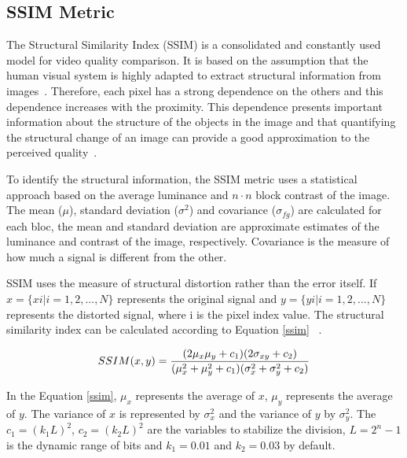 \documentclass[journal]{IEEEtran}
\begin{document}
\subsection{SSIM Metric}


The Structural Similarity Index (SSIM) is a consolidated and constantly used model for video quality comparison. It is based on the assumption that the human visual system is highly adapted to extract structural information from images~\cite{danilo:12}. Therefore, each pixel has a strong dependence on the others and this dependence increases with the proximity. This dependence presents important information about the structure of the objects in the image and that quantifying the structural change of an image can provide a good approximation to the perceived quality~\cite{Wang:02}.

To identify the structural information, the SSIM metric uses a statistical approach based on the average luminance and $n \cdot n$ block contrast of the image. The mean ($\mu$), standard deviation ($\sigma^{2}$) and covariance ($\sigma_{fg}$) are calculated for each bloc, the mean and standard deviation are approximate estimates of the luminance and contrast of the image, respectively. Covariance is the measure of how much a signal is different from the other.

SSIM uses the measure of structural distortion rather than the error itself. If $x = \{x i | i = 1, 2,. . . , N\}$ represents the original signal and $y = \{y i | i = 1, 2,. . . , N\}$ represents the distorted signal, where i is the pixel index value. The structural similarity index can be calculated according to Equation \ref{ssim} ~\cite{oliveira:16}\cite{Wang:02}.

\begin{equation}
\label{ssim}
\centering
SSIM(x, y) = \frac{(2\mu _{x}\mu _{y} + c _{1})(2\sigma _{xy}+c _{2})}{(\mu_{x}^{2}+\mu_{y}^{2}+ c_{1})(\sigma _{x}^{2}+\sigma _{y}^{2}+c _{2})}
\end{equation}



In the Equation \ref{ssim},  $\mu_{x}$ represents the average of $x$,  $\mu_{y}$ represents the average of $y$. The variance of $x$ is represented by $\sigma _{x}^{2}$ and the variance of $y$ by $\sigma _{y}^{2}$. The $c_{1}=(k_{1}L)^{2}$, $c_{2}=(k_{2}L)^{2}$ are the variables to stabilize the division, $L = 2^{n} - 1$ is the dynamic range of bits and $k_{1}=0.01$ and $k_{2}=0.03$ by default.
\end{document}
